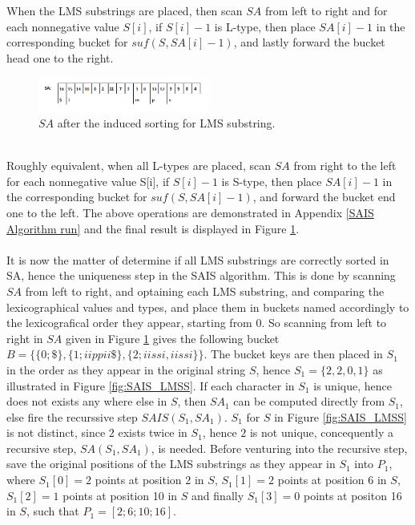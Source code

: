 \documentclass[12pt]{article} %
\begin{document}
When the LMS substrings are placed, then scan $SA$ from left to right and for each nonnegative value $S[i]$, if $S[i]-1$ is L-type, then place $SA[i]-1$ in the corresponding bucket for $suf(S, SA[i]-1)$, and lastly forward the bucket head one to the right. 
\begin{figure}[H]
    \centering
    \includegraphics[width=0.5\textwidth]{SAIS_LMSfinal}
    \captionsetup{width=0.8\textwidth}
    \caption{$SA$ after the induced sorting for LMS substring.}
    \label{fig:SAIS_LMSfinal}
    
\end{figure}
\\
Roughly equivalent, when all L-types are placed, scan $SA$ from right to the left for each nonnegative value S[i], if $S[i]-1$ is S-type, then place $SA[i]-1$ in the corresponding bucket for $suf(S, SA[i]-1)$, and forward the bucket end one to the left. The above operations are demonstrated in Appendix \ref{SAIS Algorithm run} and the final result is displayed in Figure \ref{fig:SAIS_LMSfinal}.
\\ \\
It is now the matter of determine if all LMS substrings are correctly sorted in SA, hence the uniqueness step in the SAIS algorithm. This is done by scanning $SA$ from left to right, and optaining each LMS substring, and comparing the lexicographical values and types, and place them in buckets named accordingly to the lexicografical order they appear, starting from 0. So scanning from left to right in $SA$ given in Figure \ref{fig:SAIS_LMSfinal} gives the following bucket $B = \{\{0; \$\}, \{1; iippii\$\}, \{2; iissi, iissi\}\}$. The bucket keys are then placed in $S_1$ in the order as they appear in the original string $S$, hence $S_1 = \{2,2,0,1\}$ as illustrated in Figure \ref{fig:SAIS_LMSS}. If each character in $S_1$ is unique, hence does not exists any where else in $S$, then $SA_1$ can be computed directly from $S_1$, else fire the recurssive step $SAIS(S_1, SA_1)$. $S_1$ for $S$ in Figure \ref{fig:SAIS_LMSS} is not distinct, since $2$ exists twice in $S_1$, hence $2$ is not unique, concequently a recursive step, $SA(S_1, SA_1)$,  is needed. Before venturing into the recursive step, save the original positions of the LMS substrings as they appear in $S_1$ into $P_1$, where $S_{1}[0] = 2$ points at position 2 in $S$,  $S_{1}[1] = 2$ points at position 6 in $S$, $S_{1}[2] = 1$ points at position 10 in $S$ and finally $S_{1}[3] = 0$ points at positon 16 in $S$, such that $P_1=[2; 6; 10; 16]$.
\end{document}
